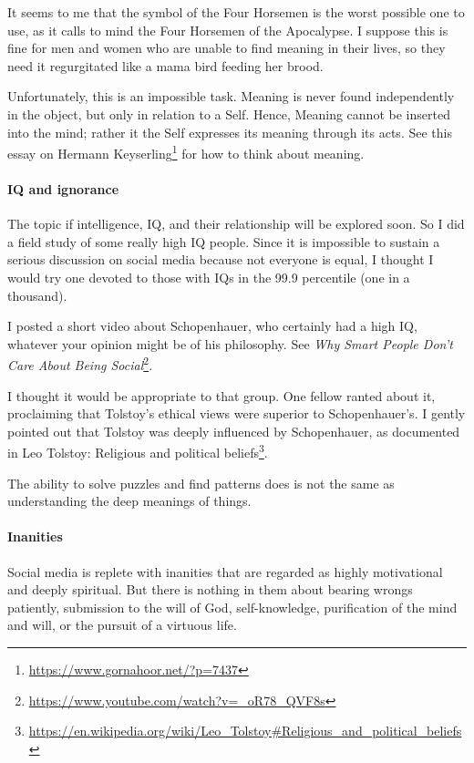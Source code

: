 It seems to me that the symbol of the Four Horsemen is the worst possible one to use, as it calls to mind the Four Horsemen of the Apocalypse. I suppose this is fine for men and women who are unable to find meaning in their lives, so they need it regurgitated like a mama bird feeding her brood.

Unfortunately, this is an impossible task. Meaning is never found independently in the object, but only in relation to a Self. Hence, Meaning cannot be inserted into the mind; rather it the Self expresses its meaning through its acts. See this essay on Hermann Keyserling\footnote{\url{https://www.gornahoor.net/?p=7437}} for how to think about meaning.

\paragraph{IQ and ignorance}
The topic if intelligence, IQ, and their relationship will be explored soon. So I did a field study of some really high IQ people. Since it is impossible to sustain a serious discussion on social media because not everyone is equal, I thought I would try one devoted to those with IQs in the 99.9 percentile (one in a thousand).

I posted a short video about Schopenhauer, who certainly had a high IQ, whatever your opinion might be of his philosophy. See \textit{Why Smart People Don't Care About Being Social}\footnote{\url{https://www.youtube.com/watch?v=_oR78_QVF8s}}.

I thought it would be appropriate to that group. One fellow ranted about it, proclaiming that Tolstoy's ethical views were superior to Schopenhauer's. I gently pointed out that Tolstoy was deeply influenced by Schopenhauer, as documented in Leo Tolstoy: Religious and political beliefs\footnote{\url{https://en.wikipedia.org/wiki/Leo_Tolstoy\#Religious_and_political_beliefs}}.

The ability to solve puzzles and find patterns does is not the same as understanding the deep meanings of things.

\paragraph{Inanities}
Social media is replete with inanities that are regarded as highly motivational and deeply spiritual. But there is nothing in them about bearing wrongs patiently, submission to the will of God, self-knowledge, purification of the mind and will, or the pursuit of a virtuous life.

